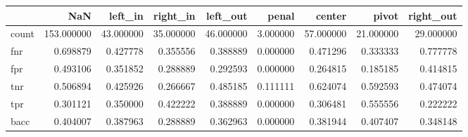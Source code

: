 \begin{tabular}{lrrrrrrrr}
\toprule
{} &         NaN &    left\_in &   right\_in &   left\_out &     penal &     center &      pivot &  right\_out \\
\midrule
count &  153.000000 &  43.000000 &  35.000000 &  46.000000 &  3.000000 &  57.000000 &  21.000000 &  29.000000 \\
fnr   &    0.698879 &   0.427778 &   0.355556 &   0.388889 &  0.000000 &   0.471296 &   0.333333 &   0.777778 \\
fpr   &    0.493106 &   0.351852 &   0.288889 &   0.292593 &  0.000000 &   0.264815 &   0.185185 &   0.414815 \\
tnr   &    0.506894 &   0.425926 &   0.266667 &   0.485185 &  0.111111 &   0.624074 &   0.592593 &   0.474074 \\
tpr   &    0.301121 &   0.350000 &   0.422222 &   0.388889 &  0.000000 &   0.306481 &   0.555556 &   0.222222 \\
bacc  &    0.404007 &   0.387963 &   0.288889 &   0.362963 &  0.000000 &   0.381944 &   0.407407 &   0.348148 \\
\bottomrule
\end{tabular}
